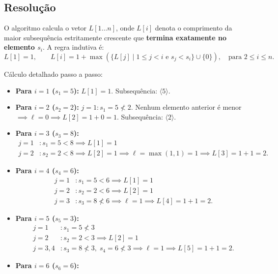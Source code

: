 \documentclass[11pt,a4paper]{article}
\begin{document}
\subsection*{Resolução}

O algoritmo calcula o vetor $L[1 \dots n]$, onde $L[i]$ denota o comprimento da maior subsequência estritamente crescente que \textbf{termina exatamente no elemento $s_i$}. A regra indutiva é:
\begin{equation}
L[1] = 1, \qquad L[i] = 1 + \max \left( \{ L[j] \mid 1 \le j < i \text{ e } s_j < s_i \} \cup \{0\} \right), \quad \text{para } 2 \le i \le n.
\end{equation}

Cálculo detalhado passo a passo:
\begin{itemize}
    \item \textbf{Para $i = 1$ ($s_1 = 5$):} $L[1] = 1$. Subsequência: $\langle 5 \rangle$.
    \item \textbf{Para $i = 2$ ($s_2 = 2$):}
    $j = 1: s_1 = 5 \not< 2$.
    Nenhum elemento anterior é menor $\implies \ell = 0 \implies L[2] = 1 + 0 = 1$. Subsequência: $\langle 2 \rangle$.
    \item \textbf{Para $i = 3$ ($s_3 = 8$):}
    \begin{align*}
    j = 1 &: s_1 = 5 < 8 \implies L[1] = 1 \\
    j = 2 &: s_2 = 2 < 8 \implies L[2] = 1 \implies \ell = \max(1, 1) = 1 \implies L[3] = 1 + 1 = 2.
    \end{align*}
    \item \textbf{Para $i = 4$ ($s_4 = 6$):}
    \begin{align*}
    j = 1 &: s_1 = 5 < 6 \implies L[1] = 1 \\
    j = 2 &: s_2 = 2 < 6 \implies L[2] = 1 \\
    j = 3 &: s_3 = 8 \not< 6 \implies \ell = 1 \implies L[4] = 1 + 1 = 2.
    \end{align*}
    \item \textbf{Para $i = 5$ ($s_5 = 3$):}
    \begin{align*}
    j = 1 &: s_1 = 5 \not< 3 \\
    j = 2 &: s_2 = 2 < 3 \implies L[2] = 1 \\
    j = 3, 4 &: s_3 = 8 \not< 3, \; s_4 = 6 \not< 3 \implies \ell = 1 \implies L[5] = 1 + 1 = 2.
    \end{align*}
    \item \textbf{Para $i = 6$ ($s_6 = 6$):}
    \begin{align*}

\end{align*}
\end{itemize}
\end{document}

